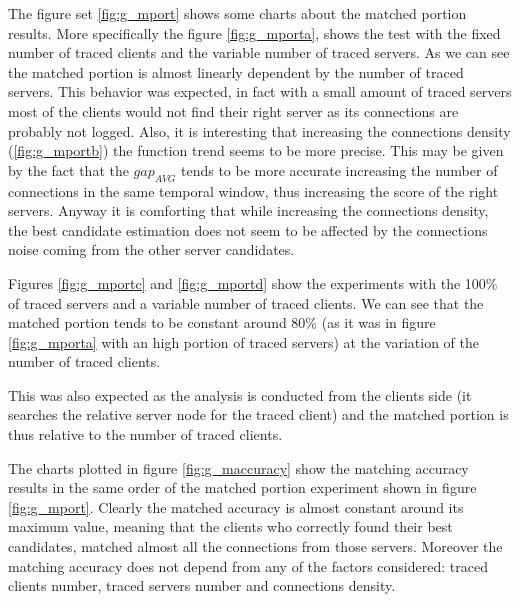 The figure set \ref{fig:g_mport} shows some charts about the matched
portion results. More specifically the figure \ref{fig:g_mporta}, shows
the test with the fixed number of traced clients and the variable number
of traced servers. As we can see the matched portion is almost linearly 
dependent by the number of traced servers.
This behavior was expected, in fact with a small amount of traced
servers most of the clients would not find their right server as its
connections are probably not logged. Also, it is interesting that
increasing the connections density (\ref{fig:g_mportb}) the function
trend seems to be more precise. This may be given by the fact that the
$gap_{AVG}$ tends to be more accurate increasing the number of
connections in the same temporal window, thus increasing the score of
the right
servers. Anyway it is comforting that while increasing the
connections density, the best candidate estimation does not seem to be affected by the 
 connections noise coming from the other server candidates.

Figures \ref{fig:g_mportc} and \ref{fig:g_mportd} show the experiments
with the 100\% of traced servers and a variable number of
traced clients. We can see
that the matched portion tends to be constant around 80\% (as it was in
figure \ref{fig:g_mporta} with an high portion of traced servers) at the variation of
the number of traced clients. 

This was also expected as the analysis is
conducted from the clients side (it searches the relative server node
for the traced client) and the matched portion is thus relative to the 
number of traced clients. 

The charts plotted in figure \ref{fig:g_maccuracy} show the matching
accuracy results in the same order of the matched portion experiment
shown in figure \ref{fig:g_mport}. Clearly the matched accuracy is
almost constant around its maximum value, meaning that the clients who
correctly found their best candidates, matched almost all the connections
from those servers. Moreover the matching accuracy does not
depend from any of the factors considered: traced clients number, traced
servers number and connections density.




